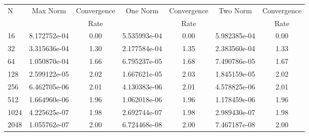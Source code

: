 \documentclass[12pt]{article}
\begin{document}
	\begin{tabular}{l|c|c|c|c|c|c}
		N&Max Norm&Convergence&One Norm&Convergence&Two Norm&Convergence\\
		&&Rate&&Rate&&Rate\\
		\hline
		16&8.172752e-04&0.00&5.535993e-04&0.00&5.982385e-04&0.00\\
		\hline
		32&3.315636e-04&1.30&2.177584e-04&1.35&2.383560e-04&1.33\\
		\hline
		64&1.050870e-04&1.66&6.795237e-05&1.68&7.490786e-05&1.67\\
		\hline
		128&2.599122e-05&2.02&1.667621e-05&2.03&1.845159e-05&2.02\\
		\hline
		256&6.462705e-06&2.01&4.130383e-06&2.01&4.578825e-06&2.01\\
		\hline
		512&1.664960e-06&1.96&1.062018e-06&1.96&1.178459e-06&1.96\\
		\hline
		1024&4.225625e-07&1.98&2.692744e-07&1.98&2.989430e-07&1.98\\
		\hline
		2048&1.055762e-07&2.00&6.724468e-08&2.00&7.467187e-08&2.00\\
	\end{tabular}
\end{document}
